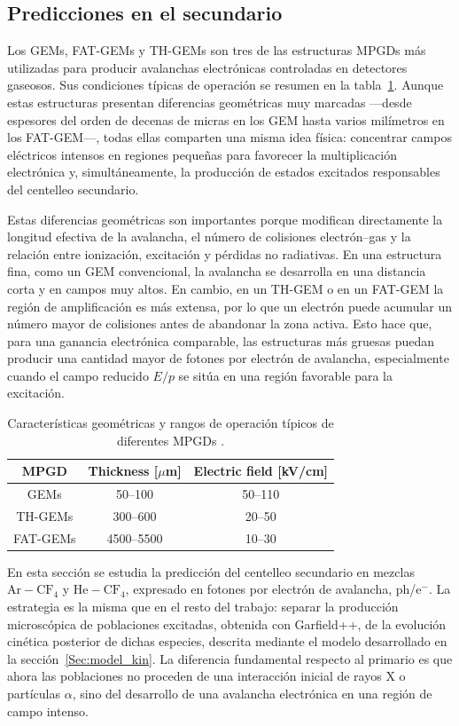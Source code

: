 \documentclass[12pt,a4paper]{article}
\newcommand{\He}{\mathrm{He}}
\newcommand{\Ar}{\mathrm{Ar}}
\newcommand{\CF}{\mathrm{CF}}
\begin{document}
\subsection{Predicciones en el secundario}

Los GEMs, FAT-GEMs y TH-GEMs son tres de las estructuras MPGDs más utilizadas para producir avalanchas electrónicas controladas en detectores gaseosos. Sus condiciones típicas de operación se resumen en la tabla~\ref{tab:mgpd}. Aunque estas estructuras presentan diferencias geométricas muy marcadas —desde espesores del orden de decenas de micras en los GEM hasta varios milímetros en los FAT-GEM—, todas ellas comparten una misma idea física: concentrar campos eléctricos intensos en regiones pequeñas para favorecer la multiplicación electrónica y, simultáneamente, la producción de estados excitados responsables del centelleo secundario.

Estas diferencias geométricas son importantes porque modifican directamente la longitud efectiva de la avalancha, el número de colisiones electrón--gas y la relación entre ionización, excitación y pérdidas no radiativas. En una estructura fina, como un GEM convencional, la avalancha se desarrolla en una distancia corta y en campos muy altos. En cambio, en un TH-GEM o en un FAT-GEM la región de amplificación es más extensa, por lo que un electrón puede acumular un número mayor de colisiones antes de abandonar la zona activa. Esto hace que, para una ganancia electrónica comparable, las estructuras más gruesas puedan producir una cantidad mayor de fotones por electrón de avalancha, especialmente cuando el campo reducido $E/p$ se sitúa en una región favorable para la excitación.

\begin{table}[h!]
\centering
\begin{tabular}{ccc}
\toprule
MPGD & Thickness [$\mu$m] & Electric field [kV/cm]  \\
\midrule
GEMs     & 50--100     & 50--110  \\
TH-GEMs  & 300--600    & 20--50   \\
FAT-GEMs & 4500--5500  & 10--30   \\
\bottomrule
\end{tabular}
\caption{Características geométricas y rangos de operación típicos de diferentes MPGDs \cite{williams2024fatgems,azevedo2016thgem,fraga2003the}.}
\label{tab:mgpd}
\end{table}

En esta sección se estudia la predicción del centelleo secundario en mezclas $\Ar-\CF_4$ y $\He-\CF_4$, expresado en fotones por electrón de avalancha, ph/e$^-$. La estrategia es la misma que en el resto del trabajo: separar la producción microscópica de poblaciones excitadas, obtenida con Garfield++, de la evolución cinética posterior de dichas especies, descrita mediante el modelo desarrollado en la sección~\ref{Sec:model_kin}. La diferencia fundamental respecto al primario es que ahora las poblaciones no proceden de una interacción inicial de rayos X o partículas $\alpha$, sino del desarrollo de una avalancha electrónica en una región de campo intenso.
\end{document}
